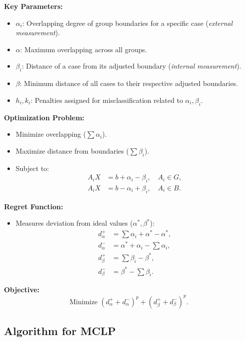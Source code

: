 \documentclass[12pt,a4paper]{article}
\begin{document}
\textbf{Key Parameters:}
\begin{itemize}
    \item \(\alpha_i\): Overlapping degree of group boundaries for a specific case (\textit{external measurement}).
    \item \(\alpha\): Maximum overlapping across all groups.
    \item \(\beta_i\): Distance of a case from its adjusted boundary (\textit{internal measurement}).
    \item \(\beta\): Minimum distance of all cases to their respective adjusted boundaries.
    \item \(h_i, k_i\): Penalties assigned for misclassification related to \(\alpha_i, \beta_i\).
\end{itemize}

\textbf{Optimization Problem:}
\begin{itemize}
    \item Minimize overlapping (\(\sum \alpha_i\)).
    \item Maximize distance from boundaries (\(\sum \beta_i\)).
    \item Subject to:
    \begin{align*}
        A_i X &= b + \alpha_i - \beta_i, \quad A_i \in G, \\
        A_i X &= b - \alpha_i + \beta_i, \quad A_i \in B.
    \end{align*}
\end{itemize}

\textbf{Regret Function:}
\begin{itemize}
    \item Measures deviation from ideal values (\(\alpha^*, \beta^*\)):
    \begin{align*}
        d_{\alpha}^+ &= \sum \alpha_i + \alpha^* - \alpha^*, \\
        d_{\alpha}^- &= \alpha^* + \alpha_i - \sum \alpha_i, \\
        d_{\beta}^+ &= \sum \beta_i - \beta^*, \\
        d_{\beta}^- &= \beta^* - \sum \beta_i.
    \end{align*}
\end{itemize}

\textbf{Objective:}
\[
\text{Minimize } (d_{\alpha}^+ + d_{\alpha}^-)^p + (d_{\beta}^+ + d_{\beta}^-)^p.
\]

\subsection{Algorithm for MCLP}
\end{document}

